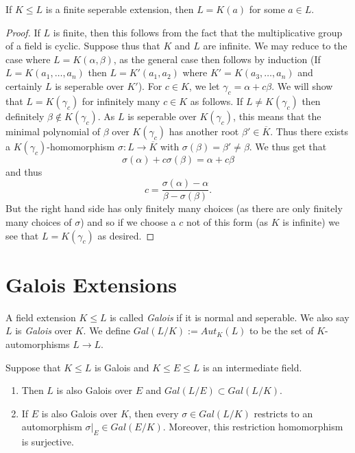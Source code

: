 \documentclass[twoside, a4paper, 10pt]{amsart}
\begin{document}
\begin{thm} If $K \leq L$ is a finite seperable extension, then $L = K(a)$ for some $a \in L$. \end{thm}

\begin{proof} If $L$ is finite, then this follows from the fact that the multiplicative group of a field is cyclic. Suppose thus that $K$ and $L$ are infinite. We may reduce to the case where $L = K(\alpha, \beta)$, as the general case then follows by induction (If $L = K(a_1, \ldots, a_n)$ then $L = K'(a_1,a_2)$ where $K' = K(a_3, \ldots, a_n)$ and certainly $L$ is seperable over $K'$). For $c \in K$, we let $\gamma_c = \alpha + c \beta$. We will show that $L = K(\gamma_c)$ for infinitely many $c \in K$ as follows. If $L \neq K(\gamma_c)$ then definitely $\beta \notin K(\gamma_c)$. As $L$ is seperable over $K(\gamma_c)$, this means that the minimal polynomial of $\beta$ over $K(\gamma_c)$ has another root $\beta' \in \overline{K}$. Thus there exists a $K(\gamma_c)$-homomorphism $\sigma:L \to \overline{K}$ with $\sigma(\beta) = \beta' \neq \beta$. We thus get that $$\sigma(\alpha) + c \sigma(\beta) = \alpha + c \beta$$ and thus $$c = \frac{\sigma(\alpha) - \alpha}{\beta - \sigma(\beta)}.$$ But the right hand side has only finitely many choices (as there are only finitely many choices of $\sigma$) and so if we choose a $c$ not of this form (as $K$ is infinite) we see that $L = K(\gamma_c)$ as desired. \end{proof}

\section{Galois Extensions}

\begin{mydef} A field extension $K \leq L$ is called \textit{Galois} if it is normal and seperable. We also say $L$ is \textit{Galois} over $K$. We define $Gal(L/K) := Aut_K(L)$ to be the set of $K$-automorphisms $L \to L$.

\end{mydef}

\begin{prop} Suppose that $K \leq L$ is Galois and $K \leq E \leq L$ is an intermediate field. 

\begin{enumerate}
	\item Then $L$ is also Galois over $E$ and $Gal(L/E) \subset Gal(L/K)$.
	\item If $E$ is also Galois over $K$, then every $\sigma \in Gal(L/K)$ restricts to an automorphism $\sigma|_E \in Gal(E/K)$. Moreover, this restriction homomorphism is surjective.
\end{enumerate}
\end{prop}
\end{document}

